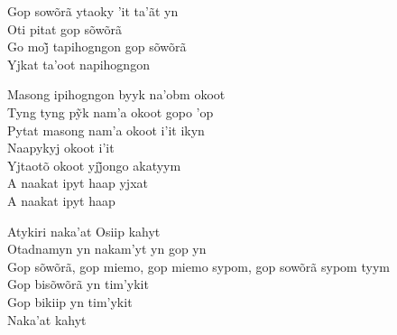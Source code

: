  \smallskip
 \begin{center}\end{center}
 \smallskip
 
\noindent   Gop sowõrã ytaoky 'it ta'ãt yn\\
  Oti pitat gop sõwõrã\\
  Go moj̃ tapihogngon gop sõwõrã\\
  Yjkat ta'oot napihogngon
 
 \smallskip
 \begin{center}\end{center}
 \smallskip
 
\noindent   Masong ipihogngon byyk na'obm okoot\\
  Tyng tyng pỹk nam’a okoot gopo ’op\\
  Pytat masong nam'a okoot i'it ikyn\\
  Naapykyj okoot i'it\\
  Yjtaotõ okoot yjj̃ongo akatyym\\
  A naakat ipyt haap yjxat\\
  A naakat ipyt haap
 
 \smallskip
 \begin{center}\end{center}
 \smallskip
 
\noindent   Atykiri naka'at Osiip kahyt\\
  Otadnamyn yn nakam'yt yn gop yn\\
  Gop sõwõrã, gop miemo, gop miemo sypom, gop sowõrã sypom tyym\\
  Gop bisõwõrã yn tim'ykit\\
  Gop bikiip yn tim'ykit\\
  Naka'at kahyt
 
